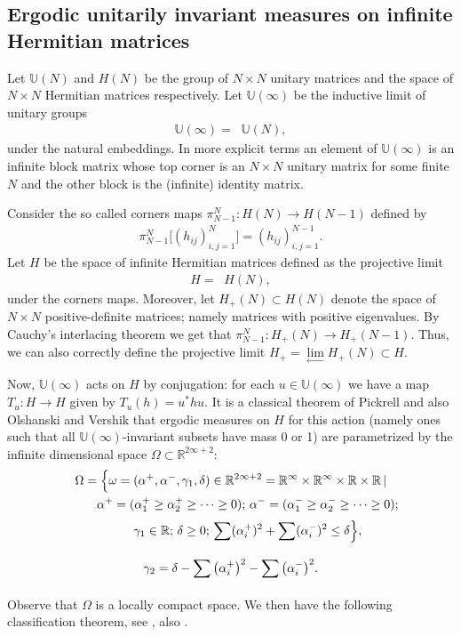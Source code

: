 \subsection{Ergodic unitarily invariant measures on infinite Hermitian matrices}\label{section1.2}

Let $\mathbb{U}(N)$ and $H(N)$ be the group of $N \times N$ unitary matrices and the space of $N \times N$ Hermitian matrices respectively. Let $\mathbb{U}(\infty)$ be the inductive limit of unitary groups
\begin{gather*}
\mathbb{U}(\infty)=\mathop{\underset{\rightarrow}{\lim}}\mathbb{U}(N),
\end{gather*}
 under the natural embeddings. In more explicit terms an element of $\mathbb{U}(\infty)$ is an infinite block matrix whose top corner is an $N\times N$ unitary matrix for some finite $N$ and the other block is the (infinite) identity matrix.

Consider the so called corners maps $\pi^N_{N-1}\colon H(N)\to H(N-1)$ defined by
\begin{align}\label{Corners}
\pi_{N-1}^N\big[(h_{ij})_{i,j=1}^N\big]= (h_{ij} )_{i,j=1}^{N-1}.
\end{align}
Let $H$ be the space of infinite Hermitian matrices defined as the projective limit
\begin{gather*}
H=\mathop{\underset{\leftarrow}{\lim}}H(N),
\end{gather*}
under the corners maps. Moreover, let $H_+(N)\subset H(N)$ denote the space of $N \times N$ positive-definite matrices; namely matrices with positive eigenvalues. By Cauchy's interlacing theorem we get that $\pi^N_{N-1}\colon H_+(N)\to H_+(N-1)$. Thus, we can also correctly define the projective limit $H_+=\underset{\leftarrow}{\lim}H_+(N) \subset H$.

Now, $\mathbb{U}(\infty)$ acts on $H$ by conjugation: for each $u \in \mathbb{U}(\infty)$ we have a map $T_u\colon H \to H$ given by $T_u(h)=u^*hu$. It is a classical theorem of Pickrell \cite{Pickrell} and also Olshanski and Vershik \cite{OlshanskiVershik} that ergodic measures on $H$ for this action (namely ones such that all $\mathbb{U}(\infty)$-invariant subsets have mass 0 or 1) are parametrized by the infinite dimensional space $\Omega \subset \mathbb{R}^{2\infty+2}$:
\begin{gather}
\Omega =\Big\{\omega=(\alpha^+,\alpha^-,\gamma_1,\delta)\in \mathbb{R}^{2\infty+2}=\mathbb{R}^\infty \times \mathbb{R}^\infty \times \mathbb{R} \times \mathbb{R}\,|\nonumber\\
\hphantom{\Omega =\Big\{}{}\alpha^+ =(\alpha_1^+\ge \alpha_2^+\ge \cdots \ge 0) ; \, \alpha^-=(\alpha_1^-\ge \alpha_2^-\ge \cdots \ge 0);\nonumber\\
\hphantom{\Omega =\Big\{}{} \gamma_1 \in \mathbb{R} ;\, \delta \ge 0 ;\,\sum_{}^{}(\alpha_i^+)^2 + \sum_{}^{}(\alpha_i^-)^2\le \delta \Big\},\nonumber\\
 \gamma_2=\delta-\sum_{}^{}\big(\alpha_i^+\big)^2 - \sum_{}^{}\big(\alpha_i^-\big)^2.\label{Omegadefinition}
\end{gather}
Observe that $\Omega$ is a locally compact space. We then have the following classification theorem, see \cite{OlshanskiVershik,Pickrell}, also \cite{Defosseux}.

